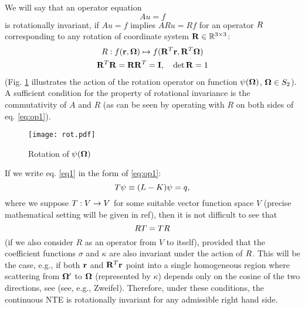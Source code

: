 We will say that an operator equation
\begin{equation}\label{eq:op1} 
Au = f
\end{equation}
is rotationally invariant, if $Au = f$ implies $ARu = Rf$ for an operator
$\op{R}$ corresponding to any rotation of coordinate system $\mat{R}\in\R[3\times3]$:
\begin{equation}\label{eq:def_rot}
\begin{gathered}
\op{R}: f(\br,\bomega) \mapsto f(\mat{R}^T\br,\mat{R}^T\bomega)\\
\mat{R}^T\mat{R} = \mat{R}\mat{R}^T = \mat{I},\quad \det \mat{R} = 1
\end{gathered}
\end{equation}
(Fig. \ref{fig:rot} illustrates the action of the rotation operator on function $\psi(\bomega)$,
$\bomega\in\Sphere$).
A sufficient condition for the property of rotational invariance is the commutativity of $A$ and $R$ (as can be seen by
operating with $R$ on both sides of eq. \eqref{eq:op1}). 
\begin{figure}[htp]
\begin{center}
  \texttt{[image: rot.pdf]}
  \caption[Rotation of $\psi(\bomega)$]{Rotation of $\psi(\bomega)$}
  \label{fig:rot}
\end{center}
\end{figure}
If we write eq. \eqref{eq1} in the form of \eqref{eq:op1}:
\begin{equation}\label{eq1op}
	T\psi \equiv (\op{L} - \op{K})\psi = \op{q},
\end{equation} 
where we suppose $\op{T}:V\to V$ for some suitable vector function space $V$ (precise mathematical setting
will be given in \alert{ref}), then it is not difficult to see that 
\begin{equation}\label{eq:commut_NTE}
	\op{R}T = T\op{R}
\end{equation}
(if we also consider $R$ as an operator from $V$ to itself),
provided that the coefficient functions $\sigma$ and $\kappa$ are also invariant under the action of $\op{R}$. This
will be the case, e.g., if both $\br$ and $\mat{R}^T\br$ point into a single homogeneous region where scattering from
$\bomega'$ to $\bomega$ (represented by $\kappa$) depends only on the cosine of the two directions, see (see, e.g.,
\alert{Zweifel}). Therefore, under these conditions, the continuous NTE is rotationally invariant for any admissible
right hand side.

